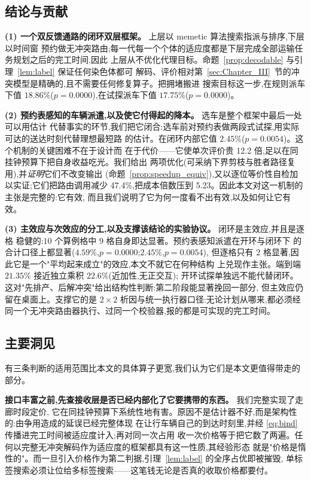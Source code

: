 \documentclass[manuscript,screen,review]{acmart}
\newcommand{\NCases}{10}
\newcommand{\GainLoopRule}{18.86\%}      %
\newcommand{\PLoopRule}{0.0000}
\newcommand{\GainLoopProbe}{17.75\%}     %
\newcommand{\PLoopProbe}{0.0000}
\newcommand{\GainProbeOpen}{4.59\%}      %
\newcommand{\PProbeOpen}{0.0000}
\newcommand{\GainProbeLoop}{2.45\%}      %
\newcommand{\PProbeLoop}{0.0054}
\newcommand{\GainEndToEnd}{21.35\%}      %
\newcommand{\GainIndepProduct}{22.6\%}
\newcommand{\CellsSigLoop}{9}
\newcommand{\CellsSigProbe}{2}
\newcommand{\RouteCallCut}{47.4\%}
\newcommand{\CostMultBefore}{12.2}
\newcommand{\CostMultAfter}{5.23}
\begin{document}
\subsection{结论与贡献}
\label{sec:contributions}

\textbf{(1) 一个双反馈通路的闭环双层框架。} 上层以 memetic 算法搜索指派与排序,下层以时间窗
预约做无冲突路由;每一代每一个个体的适应度都是下层完成全部运输任务规划之后的完工时间,因此
上层从不优化代理目标。命题~\ref{prop:decodable} 与引理~\ref{lem:label} 保证任何染色体都可
解码、评价相对第~\ref{sec:Chapter_III}~节的冲突模型是精确的,且不需要任何修复算子。把拥堵搬进
搜索目标这一步,在规则派车下值 $\GainLoopRule$($p=\PLoopRule$),在试探派车下值
$\GainLoopProbe$($p=\PLoopProbe$)。

\textbf{(2) 预约表感知的车辆派遣,以及使它付得起的降本。} 选车是整个框架中最后一处可以用估计
代替事实的环节,我们把它闭合:选车前对预约表做两段式试探,用实际可达的送达时刻代替理想最短路
的估计。在闭环内部它值 $\GainProbeLoop$($p=\PProbeLoop$)。这个机制的关键困难不在于设计而
在于代价——它使单次评价贵 \CostMultBefore{} 倍,足以在同挂钟预算下把自身收益吃光。我们给出
两项优化(可采纳下界剪枝与胜者路径复用),并\emph{证明}它们不改变输出
(命题~\ref{prop:speedup_equiv}),又以逐位等价性自检加以实证;它们把路由调用减少
\RouteCallCut{},把成本倍数压到 \CostMultAfter{}。因此本文对这一机制的主张是完整的:它有效,
而且我们说明了它为何一度看不出有效,以及如何让它有效。

\textbf{(3) 主效应与次效应的分工,以及支撑该结论的实验协议。} 闭环是主效应,并且是逐格
稳健的:$\NCases$ 个算例格中 $\CellsSigLoop$ 格自身即达显著。预约表感知派遣在开环与闭环下
的合计口径上都显著($\GainProbeOpen$,$p=\PProbeOpen$;$\GainProbeLoop$,$p=\PProbeLoop$),
但逐格只有 $\CellsSigProbe$ 格显著,因此它是一个"平均起来成立"的效应,本文不就它在何种结构
上兑现作主张。端到端 $\GainEndToEnd$ 接近独立乘积 $\GainIndepProduct$(近加性,无正交互);
开环试探单独远不能代替闭环。这对"先排产、后解冲突"给出结构性判断:第二阶段能显著挽回一部分,
但主效应仍留在桌面上。支撑它的是 $2\times2$ 析因与统一执行器口径:无论计划从哪来,都必须经
同一个无冲突路由器执行、过同一个校验器,报的都是可实现的完工时间。

\subsection{主要洞见}
\label{sec:insights}

有三条判断的适用范围比本文的具体算子更宽,我们认为它们是本文更值得带走的部分。

\textbf{接口丰富之前,先查接收层是否已经内部化了它要携带的东西。} 我们完整实现了走廊时段定价,
它在同挂钟预算下系统性地有害。原因不是估计器不好,而是架构性的:由争用造成的延误已经完整体现
在让行车辆自己的到达时刻里,并经 \eqref{eq:bind} 传播进完工时间被适应度计入;再对同一次占用
收一次价格等于把它数了两遍。任何以完整无冲突解码作为适应度的框架都具有这一性质,其经验形态
就是"价格是惰性的"。而一旦引入价格作为第二判据,引理~\ref{lem:label} 的全序占优即被摧毁,
单标签搜索必须让位给多标签搜索——这笔钱无论是否真的收取价格都要付。
\end{document}
